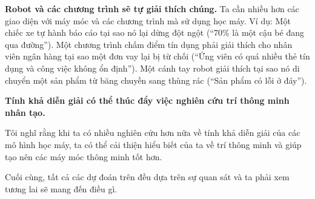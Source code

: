 \textbf{Robot và các chương trình sẽ tự giải thích chúng.}
Ta cần nhiều hơn các giao diện với máy móc và các chương trình mà sử dụng học máy. Ví dụ: Một chiếc xe tự hành báo cáo tại sao nó lại dừng đột ngột (``70\% là một cậu bé đang qua đường''). Một chương trình chấm điểm tín dụng phải giải thích cho nhân viên ngân hàng tại sao một đơn vay lại bị từ chối (``Ứng viên có quá nhiều thẻ tín dụng và công việc không ổn định''). Một cánh tay robot giải thích tại sao nó di chuyển một sản phẩm từ băng chuyền sang thùng rác (``Sản phẩm có lỗi ở đáy'').

\textbf{Tính khả diễn giải có thể thúc đẩy việc nghiên cứu trí thông minh nhân tạo.}

Tôi nghĩ rằng khi ta có nhiều nghiên cứu hơn nữa về tính khả diễn giải của các mô hình học máy, ta có thể cải thiện hiểu biết của ta về trí thông minh và giúp tạo nên các máy móc thông minh tốt hơn.

Cuối cùng, tất cả các dự đoán trên đều dựa trên sự quan sát và ta phải xem tương lai sẽ mang đến điều gì.
\clearpage